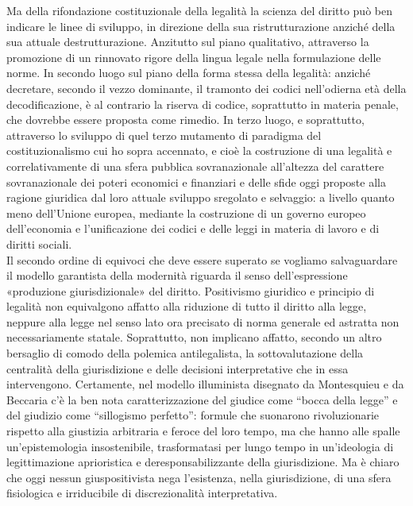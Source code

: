 Ma della rifondazione costituzionale della legalità la scienza del diritto può ben indicare le linee di sviluppo, in direzione della sua ristrutturazione anziché della sua attuale destrutturazione. Anzitutto sul piano qualitativo, attraverso la promozione di un rinnovato rigore della lingua legale nella formulazione delle norme. In secondo luogo sul piano della forma stessa della legalità: anziché decretare, secondo il vezzo dominante, il tramonto dei codici nell’odierna età della decodificazione, è al contrario la riserva di codice, soprattutto in materia penale, che dovrebbe essere proposta come rimedio. In terzo luogo, e soprattutto, attraverso lo sviluppo di quel terzo mutamento di paradigma del costituzionalismo cui ho sopra accennato, e cioè la costruzione di una legalità e correlativamente di una sfera pubblica sovranazionale all’altezza del carattere sovranazionale dei poteri economici e finanziari e delle sfide oggi proposte alla ragione giuridica dal loro attuale sviluppo sregolato e selvaggio: a livello quanto meno dell’Unione europea, mediante la costruzione di un governo europeo dell’economia e l’unificazione dei codici e delle leggi in materia di lavoro e di diritti sociali.
\\Il secondo ordine di equivoci che deve essere superato se vogliamo salvaguardare il modello garantista della modernità riguarda il senso dell’espressione «produzione giurisdizionale» del diritto.
Positivismo giuridico e principio di legalità non equivalgono affatto alla riduzione di tutto il diritto alla legge, neppure alla legge nel senso lato ora precisato di norma generale ed astratta non necessariamente statale. Soprattutto, non implicano affatto, secondo un altro bersaglio di comodo della polemica antilegalista, la sottovalutazione della centralità della giurisdizione e delle decisioni interpretative che in essa intervengono. Certamente, nel modello illuminista disegnato da Montesquieu e da Beccaria c’è la ben nota caratterizzazione del giudice come “bocca della legge” e del giudizio come “sillogismo perfetto”: formule che suonarono rivoluzionarie rispetto alla giustizia arbitraria e feroce del loro tempo, ma che hanno alle spalle un’epistemologia insostenibile, trasformatasi per lungo tempo in un’ideologia di legittimazione aprioristica e deresponsabilizzante della giurisdizione. Ma è chiaro che oggi nessun giuspositivista nega l’esistenza, nella giurisdizione, di una sfera fisiologica e irriducibile di discrezionalità interpretativa.
